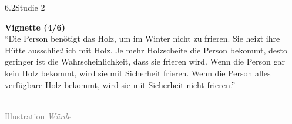 \documentclass[xcolor=table,9pt,aspectratio=169]{beamer}
\begin{document}
\begin{frame}{\vspace*{10mm}6.2\hspace*{1em}Studie 2}
\begin{multicols}{2}
   \textbf{Vignette (4/6)}\\
   \medskip
   \enquote{Die Person benötigt das Holz, um im Winter nicht zu frieren. Sie heizt ihre Hütte ausschließlich mit Holz. Je mehr Holzscheite die Person bekommt, desto geringer ist die Wahrscheinlichkeit, dass sie frieren wird. Wenn die Person gar kein Holz bekommt, wird sie mit Sicherheit frieren. Wenn die Person alles verfügbare Holz bekommt, wird sie mit Sicherheit nicht frieren.}\\
   \vfill
   \begin{center}
      \\
      \textcolor{gray}{Illustration \textit{Würde}}
   \end{center}
\end{multicols}
\end{frame}
\end{document}
